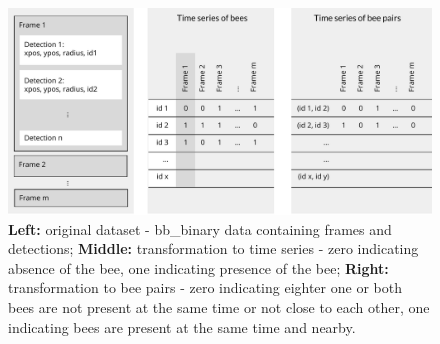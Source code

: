 \begin{figure}[htb]
	\centering
	\includegraphics[width=1.0\textwidth]{Figures/structure}
	\caption[Structure of Dataset]{\textbf{Left:} original dataset - bb\_binary data containing frames and detections; \textbf{Middle:} transformation to time series - zero indicating absence of the bee, one indicating presence of the bee; \textbf{Right:} transformation to bee pairs - zero indicating eighter one or both bees are not present at the same time or not close to each other, one indicating bees are present at the same time and nearby.}
	\label{fig:structure}
\end{figure}

